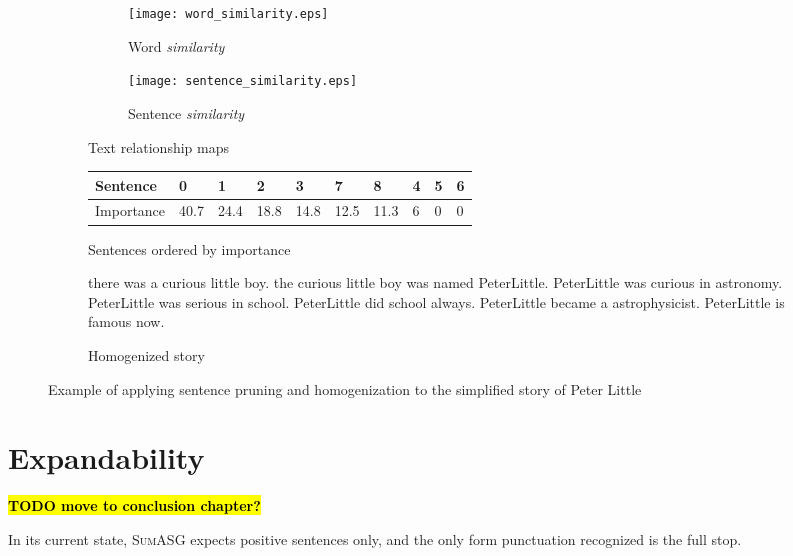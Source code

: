 \begin{figure}[H]
\begin{subfigure}{\textwidth}
\begin{subfigure}{0.5\textwidth}
\renewcommand\thesubfigure{\roman{subfigure}}
\texttt{[image: word\_similarity.eps]}
\caption{Word \textit{similarity}}
\end{subfigure}
\begin{subfigure}{0.5\textwidth}
\renewcommand\thesubfigure{\roman{subfigure}}
\texttt{[image: sentence\_similarity.eps]}
\caption{Sentence \textit{similarity}}
\end{subfigure}
\setcounter{subfigure}{0}
\caption{Text relationship maps}
\end{subfigure}
\begin{subfigure}{\textwidth}
\vspace{\baselineskip}
\centering
\begin{tabular}{@{}llllllllll@{}}
\toprule
Sentence   & 0    & 1    & 2    & 3    & 7    & 8    & 4 & 5 & 6 \\ \midrule
Importance & 40.7 & 24.4 & 18.8 & 14.8 & 12.5 & 11.3 & 6 & 0 & 0 \\ \bottomrule
\end{tabular}
\caption{Sentences ordered by importance}
\end{subfigure}
\begin{subfigure}{\textwidth}
\vspace{\baselineskip}
\begin{displayquote}
there was a curious little boy. the curious little boy was named PeterLittle. PeterLittle was curious in astronomy. PeterLittle was serious in school. PeterLittle did school always. PeterLittle became a astrophysicist. PeterLittle is famous now.
\end{displayquote}
\caption{Homogenized story}
\end{subfigure}
\caption{Example of applying sentence pruning and homogenization to the simplified story of Peter Little}
\label{fig:preprocessor_example}
\end{figure}

\section{Expandability}

\textcolor{red}{\textbf{\hl{TODO move to conclusion chapter?}}}

In its current state, \textsc{SumASG} expects positive sentences only, and the only form punctuation recognized is the full stop.


